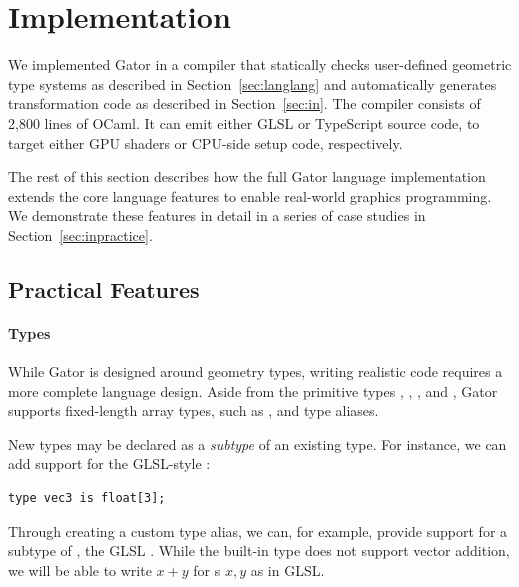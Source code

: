 \section{Implementation}
\label{sec:practice}

We implemented Gator in a compiler that statically checks user-defined geometric type systems as described in Section~\ref{sec:langlang} and automatically generates transformation code as described in Section~\ref{sec:in}.
The compiler consists of 2,800 lines of OCaml.
It can emit either GLSL or TypeScript source code, to target either GPU shaders or CPU-side setup code, respectively.

The rest of this section describes how the full Gator language implementation extends the core language features to enable real-world graphics programming.
We demonstrate these features in detail in a series of case studies in Section~\ref{sec:inpractice}.

\subsection{Practical Features}
\label{sec:target}
\paragraph{Types}

While Gator is designed around geometry types, writing realistic code requires a more complete language design.
Aside from the primitive types , , , and , Gator supports fixed-length array types, such as , and type aliases.

New types may be declared as a \emph{subtype} of an existing type.
For instance, we can add support for the GLSL-style :
%
\begin{lstlisting}
type vec3 is float[3];
\end{lstlisting}
%
Through creating a custom type alias, we can, for example, provide support for a subtype of , the GLSL .
While the built-in  type does not support vector addition, we will be able to write $x+y$ for s $x,y$ as in GLSL.

